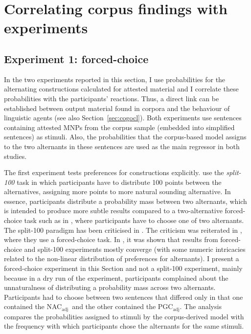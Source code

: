 \documentclass[USenglish]{article}
\newcommand{\Sub}[1]{\ensuremath{\mathrm{_{#1}}}}
\newcommand{\NACa}{NAC\Sub{adj}}
\newcommand{\PGCa}{PGC\Sub{adj}}
\begin{document}


\section{Correlating corpus findings with experiments}
\label{sec:experimental}

\subsection{Experiment 1: forced-choice}
\label{sec:exp:fc}

In the two experiments reported in this section, I use probabilities for the alternating constructions calculated for attested material and I correlate these probabilities with the participants' reactions.
Thus, a direct link can be established between output material found in corpora and the behaviour of linguistic agents (see also Section~\ref{sec:cogocl}).
Both experiments use sentences containing attested MNPs from the corpus sample (embedded into simplified sentences) as stimuli.
Also, the probabilities that the corpus-based model assigns to the two alternants in these sentences are used as the main regressor in both studies.

The first experiment tests preferences for constructions explicitly.
\cite{FordBresnan2013} use the \textit{split-100} task in which participants have to distribute 100 points between the alternatives, assigning more points to more natural sounding alternative.
In essence, participants distribute a probability mass between two alternants, which is intended to produce more subtle results compared to a two-alternative forced-choice task such as in \cite{Rosenbach2013}, where participants have to choose one of two alternants.
The split-100 paradigm has been criticised in \cite{ArppeJaervikivi2007}.
The criticism was reiterated in \cite{DivjakEa2016}, where they use a forced-choice task.
In \cite{VerhoevenTemme2017}, it was shown that results from forced-choice and split-100 experiments mostly converge (with some numeric intricacies related to the non-linear distribution of preferences for alternants).
I present a forced-choice experiment in this Section and not a split-100 experiment, mainly because in a dry run of the experiment, participants complained about the unnaturalness of distributing a probability mass across two alternants.
Participants had to choose between two sentences that differed only in that one contained the \NACa\ and the other contained the \PGCa.
The analysis compares the probabilities assigned to stimuli by the corpus-derived model with the frequency with which participants chose the alternants for the same stimuli.
\end{document}
